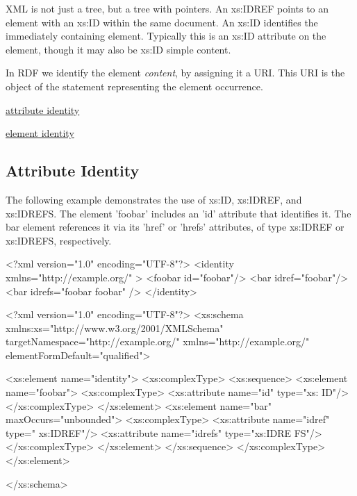 XML is not just a tree, but a tree with pointers. An xs:IDREF points to an element with an xs:ID within the same document. An xs:ID identifies the immediately containing element. Typically this is an xs:ID attribute on the element, though it may also be xs:ID simple content.

In RDF we identify the element {\itshape content\/}, by assigning it a URI. This URI is the object of the statement representing the element occurrence.


\begin{DoxyItemize}
\item \hyperlink{attributeid}{attribute identity}
\item \hyperlink{elementid}{element identity} 
\end{DoxyItemize}\hypertarget{attributeID}{}\subsection{Attribute Identity}\label{attributeID}
The following example demonstrates the use of xs:ID, xs:IDREF, and xs:IDREFS. The element 'foobar' includes an 'id' attribute that identifies it. The bar element references it via its 'href' or 'hrefs' attributes, of type xs:IDREF or xs:IDREFS, respectively.


\begin{DoxyCodeInclude}
<?xml version="1.0" encoding="UTF-8"?>
<identity xmlns="http://example.org/" >
        <foobar id="foobar"/>
        <bar idref="foobar"/>
        <bar idrefs="foobar foobar" />
</identity>
\end{DoxyCodeInclude}
 
\begin{DoxyCodeInclude}
<?xml version="1.0" encoding="UTF-8"?>
<xs:schema xmlns:xs="http://www.w3.org/2001/XMLSchema" 
        targetNamespace="http://example.org/" xmlns="http://example.org/"
        elementFormDefault="qualified">
        
        <xs:element name="identity">
                <xs:complexType>
                        <xs:sequence>
                                <xs:element name="foobar">
                                        <xs:complexType>
                                                <xs:attribute name="id" type="xs:
      ID"/>
                                        </xs:complexType>
                                </xs:element>
                                <xs:element name="bar" maxOccurs="unbounded">
                                        <xs:complexType>
                                                <xs:attribute name="idref" type="
      xs:IDREF"/>
                                        <xs:attribute name="idrefs" type="xs:IDRE
      FS"/>
                                        </xs:complexType>
                                </xs:element>
                        </xs:sequence>
                </xs:complexType>
        </xs:element>

</xs:schema>
\end{DoxyCodeInclude}


